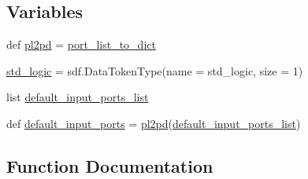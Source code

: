\subsection*{Variables}
\begin{DoxyCompactItemize}
\item 
def \hyperlink{namespacesylva_1_1code__generation_1_1vhdl__generation_a10ea31d6ea98aa308e635b9403f5721f}{pl2pd} = \hyperlink{namespacesylva_1_1code__generation_1_1vhdl__generation_a51a60df4116e05e838a7d6c61f434df5}{port\+\_\+list\+\_\+to\+\_\+dict}
\item 
\hyperlink{namespacesylva_1_1code__generation_1_1vhdl__generation_a85e74939ca684a8a978805b5918467c8}{std\+\_\+logic} = sdf.\+Data\+Token\+Type(name = \textquotesingle{}std\+\_\+logic\textquotesingle{}, size = 1)
\item 
list \hyperlink{namespacesylva_1_1code__generation_1_1vhdl__generation_a2373c5e8bd084e84746b1b6b947a2667}{default\+\_\+input\+\_\+ports\+\_\+list}
\item 
def \hyperlink{namespacesylva_1_1code__generation_1_1vhdl__generation_a0cf71880063e2c29029ca74b630eec28}{default\+\_\+input\+\_\+ports} = \hyperlink{namespacesylva_1_1code__generation_1_1vhdl__generation_a10ea31d6ea98aa308e635b9403f5721f}{pl2pd}(\hyperlink{namespacesylva_1_1code__generation_1_1vhdl__generation_a2373c5e8bd084e84746b1b6b947a2667}{default\+\_\+input\+\_\+ports\+\_\+list})
\end{DoxyCompactItemize}


\subsection{Function Documentation}
\mbox{\label{namespacesylva_1_1code__generation_1_1vhdl__generation_a94219128d04fd81a78200424dbf45356}} 
